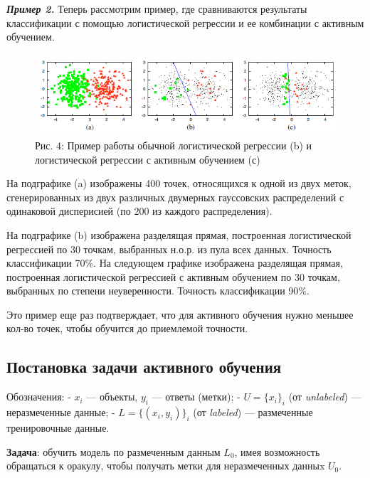 \documentclass[]{article}
\begin{document}
\emph{\textbf{Пример 2.}} Теперь рассмотрим пример, где сравниваются
результаты классификации с помощью логистической регрессии и ее
комбинации с активным обучением.

\begin{figure}[htbp]
\centering
\includegraphics[width=6.87500in]{img/example.png}
\caption{Рис. 4: Пример работы обычной логистической регрессии (b) и
логистической регрессии с активным обучением (с)}
\end{figure}

На подграфике (a) изображены 400 точек, относящихся к одной из двух
меток, сгенерированных из двух различных двумерных гауссовских
распределений с одинаковой дисперисией (по 200 из каждого
распределения).

На подграфике (b) изображена разделящая прямая, построенная
логистической регрессией по 30 точкам, выбранных н.о.р. из пула всех
данных. Точность классификации 70\%. На следующем графике изображена
разделящая прямая, построенная логистической регрессией с активным
обучением по 30 точкам, выбранных по степени неуверенности. Точность
классификации 90\%.

Это пример еще раз подтверждает, что для активного обучения нужно
меньшее кол-во точек, чтобы обучится до приемлемой точности.

\subsection{Постановка задачи активного
обучения}\label{ux43fux43eux441ux442ux430ux43dux43eux432ux43aux430-ux437ux430ux434ux430ux447ux438-ux430ux43aux442ux438ux432ux43dux43eux433ux43e-ux43eux431ux443ux447ux435ux43dux438ux44f}

Обозначения: - \(x_i\) --- объекты, \(y_i\) --- ответы (метки); -
\(U = \{x_i\}_i\) (от \emph{unlabeled}) --- неразмеченные данные; -
\(L = \{(x_i, y_i)\}_i\) (от \emph{labeled}) --- размеченные
тренировочные данные.

\textbf{Задача}: обучить модель по размеченным данным \(L_0\), имея
возможность обращаться к оракулу, чтобы получать метки для неразмеченных
данныx \(U_0\).
\end{document}
